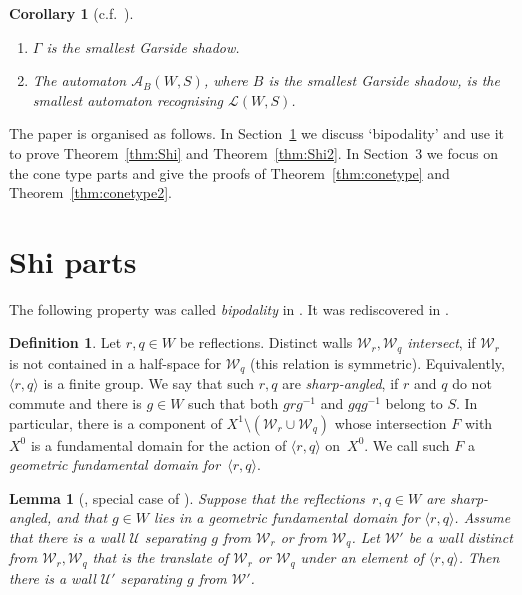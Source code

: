 \documentclass[11pt]{article}
\newtheorem{lemm}[theo]{Lemma}
\newtheorem{coro}[theo]{Corollary}
\theoremstyle{definition}
\newtheorem{defi}[theo]{Definition}
\numberwithin{equation}{section}
\newcommand{\W}{\mathcal{W}}
\newcommand{\U}{\mathcal{U}}
\begin{document}
\begin{coro}[{c.f.~\cite[Conj.~1]{HNW}}] \,
	\begin{enumerate}[label=\roman*)]
		\item $\Gamma$ is the smallest Garside shadow.
		\item The automaton $\mathcal A_B(W,S)$, where $B$ is the smallest Garside shadow, is 
		the smallest automaton recognising $\mathcal{L}(W,S)$.
	\end{enumerate}
\end{coro}


The paper is organised as follows. In Section~\ref{sec:shi_components} we discuss `bipodality' and use it to prove Theorem~\ref{thm:Shi} and Theorem~\ref{thm:Shi2}. In Section~3 we focus on the cone type parts and give the proofs of Theorem~\ref{thm:conetype} and Theorem~\ref{thm:conetype2}.

\section{Shi parts}
\label{sec:shi_components}

The following property was called \emph{bipodality} in \cite{DH}. It was rediscovered in \cite{OP}.

\begin{defi} Let $r,q\in W$ be reflections. Distinct walls $\W_r,\W_{q}$ \emph{intersect}, if $\W_r$ is not contained in a half-space
	for $\W_{q}$ (this relation is symmetric). Equivalently, $\langle r,q\rangle$ is a finite group. We say that such $r,q$ are
	\emph{sharp-angled}, if $r$ and $q$ do not commute and there is $g\in W$ such that both $grg^{-1}$ and $gqg^{-1}$ belong to $S$. In particular, there is a component of $X^1\setminus (\W_r\cup
	\W_q)$ whose intersection $F$ with $X^0$ is a fundamental domain for the action of $\langle r,q\rangle$ on~$X^0$. We call such $F$ a \emph{geometric fundamental domain for~$\langle r,q\rangle$}.
\end{defi}

\begin{lemm}[{\cite[Lem~3.2]{OP}, special case of \cite[Thm.~4.18]{DH}}]
	\label{lem:key} Suppose that the reflections~$r,q\in W$ are sharp-angled, and that $g\in W$ lies in a geometric fundamental domain for $\langle
	r,q\rangle$. Assume that there is a wall $\U$ separating $g$ from $\W_r$ or from $\W_q$. Let $\W'$ be a wall distinct from $\W_r,\W_q$ that is the
	translate of $\W_r$ or $\W_q$ under an element of $\langle r,q\rangle$. Then there is a wall $\U'$ separating $g$ from $\W'$.
\end{lemm}
\end{document}

